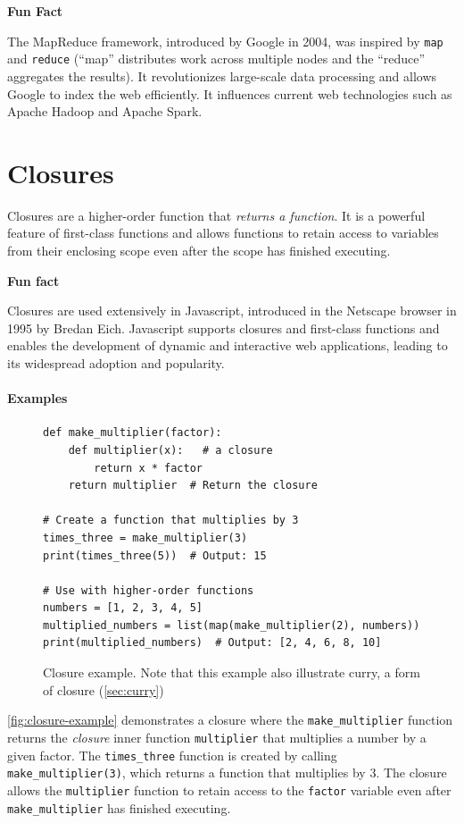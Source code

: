 \documentclass[oneside,11pt,dvipsnames]{book}
\newenvironment{historybox}[1][]{
  \small
  \begin{myhistorybox}
    {\small \textbf{#1}}
  }{
  \end{myhistorybox}
}
\newcommand{\code}[1]{\texttt{#1}}
\begin{document}
\begin{historybox}[Fun Fact]
The MapReduce framework, introduced by Google in 2004, was inspired by \code{map} and \code{reduce} (``map'' distributes work across multiple nodes and the ``reduce'' aggregates the results).  It revolutionizes large-scale data processing and allows Google to index the web efficiently. It influences current web technologies such as Apache Hadoop and Apache Spark.
\end{historybox}

\section{Closures}
Closures are a higher-order function that \emph{returns a function}. It is a powerful feature of first-class functions and allows functions to retain access to variables from their enclosing scope even after the scope has finished executing.

\begin{historybox}[Fun fact] 
    Closures are used extensively in Javascript, introduced in the Netscape browser in 1995 by Bredan Eich. Javascript supports closures and first-class functions and enables the development of dynamic and interactive web applications, leading to its widespread adoption and popularity.
\end{historybox}
\paragraph{Examples}
\begin{figure}
\begin{lstlisting}
def make_multiplier(factor):
    def multiplier(x):   # a closure
        return x * factor
    return multiplier  # Return the closure

# Create a function that multiplies by 3
times_three = make_multiplier(3)
print(times_three(5))  # Output: 15

# Use with higher-order functions
numbers = [1, 2, 3, 4, 5]
multiplied_numbers = list(map(make_multiplier(2), numbers))
print(multiplied_numbers)  # Output: [2, 4, 6, 8, 10]
\end{lstlisting}
\caption{Closure example. Note that this example also illustrate curry, a form of closure (\autoref{sec:curry})}\label{fig:closure-example}
\end{figure}

\autoref{fig:closure-example} demonstrates a closure where the \code{make\_multiplier} function returns the \emph{closure} inner function \code{multiplier} that multiplies a number by a given factor. The \code{times\_three} function is created by calling \code{make\_multiplier(3)}, which returns a function that multiplies by 3. The closure allows the \code{multiplier} function to retain access to the \code{factor} variable even after \code{make\_multiplier} has finished executing.
\end{document}
